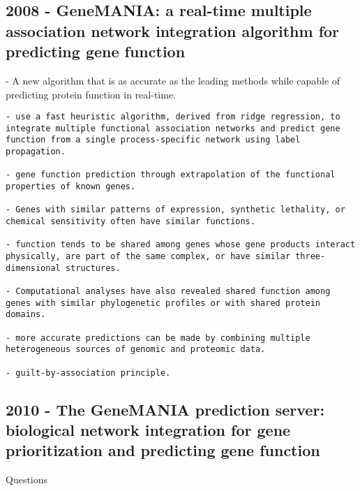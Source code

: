 \documentclass[
]{book}
\begin{document}
\hypertarget{genemania-a-real-time-multiple-association-network-integration-algorithm-for-predicting-gene-function}{%
\subsection{2008 - GeneMANIA: a real-time multiple association network integration algorithm for predicting gene function}\label{genemania-a-real-time-multiple-association-network-integration-algorithm-for-predicting-gene-function}}

- A new algorithm that is as accurate as the leading methods while capable of predicting protein function in real-time.

\begin{verbatim}
- use a fast heuristic algorithm, derived from ridge regression, to integrate multiple functional association networks and predict gene function from a single process-specific network using label propagation.

- gene function prediction through extrapolation of the functional properties of known genes.

- Genes with similar patterns of expression, synthetic lethality, or chemical sensitivity often have similar functions.

- function tends to be shared among genes whose gene products interact physically, are part of the same complex, or have similar three-dimensional structures.

- Computational analyses have also revealed shared function among genes with similar phylogenetic profiles or with shared protein domains.

- more accurate predictions can be made by combining multiple heterogeneous sources of genomic and proteomic data.

- guilt-by-association principle.
\end{verbatim}

\hypertarget{the-genemania-prediction-server-biological-network-integration-for-gene-prioritization-and-predicting-gene-function}{%
\subsection{2010 - The GeneMANIA prediction server: biological network integration for gene prioritization and predicting gene function}\label{the-genemania-prediction-server-biological-network-integration-for-gene-prioritization-and-predicting-gene-function}}

Questions
\end{document}
